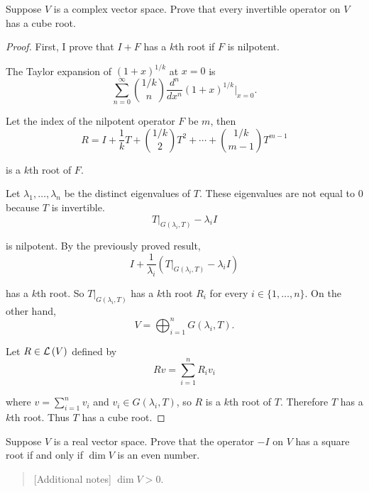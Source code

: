 \begin{exercise}\label{chapter8:sectionC:exercise3}
    Suppose $V$ is a complex vector space. Prove that every invertible operator on $V$ has a cube root.
\end{exercise}

\begin{proof}
    First, I prove that $I + F$ has a $k$th root if $F$ is nilpotent.

    The Taylor expansion of ${(1 + x)}^{1/k}$ at $x = 0$ is
    \[
        \sum^{\infty}_{n=0}\binom{1/k}{n}\frac{d^{n}}{dx^{n}}{(1 + x)}^{1/k}\vert_{x=0}.
    \]

    Let the index of the nilpotent operator $F$ be $m$, then
    \[
        R = I + \frac{1}{k}T + \binom{1/k}{2}T^{2} + \cdots + \binom{1/k}{m-1}T^{m-1}
    \]

    is a $k$th root of $F$.

    Let $\lambda_{1}, \ldots, \lambda_{n}$ be the distinct eigenvalues of $T$. These eigenvalues are not equal to $0$ because $T$ is invertible.
    \[
        T\vert_{G(\lambda_{i}, T)} - \lambda_{i}I
    \]

    is nilpotent. By the previously proved result,
    \[
        I + \frac{1}{\lambda_{i}}(T\vert_{G(\lambda_{i}, T)} - \lambda_{i}I)
    \]

    has a $k$th root. So $T\vert_{G(\lambda_{i}, T)}$ has a $k$th root $R_{i}$ for every $i\in\{1,\ldots,n\}$. On the other hand,
    \[
        V = \bigoplus^{n}_{i=1}G(\lambda_{i}, T).
    \]

    Let $R\in\mathcal{L}\left({V}\right)$ defined by
    \[
        Rv = \sum^{n}_{i=1}R_{i}v_{i}
    \]

    where $v = \sum^{n}_{i=1}v_{i}$ and $v_{i}\in G(\lambda_{i}, T)$, so $R$ is a $k$th root of $T$. Therefore $T$ has a $k$th root. Thus $T$ has a cube root.
\end{proof}
\newpage

\begin{exercise}\label{chapter8:sectionC:exercise4}
    Suppose $V$ is a real vector space. Prove that the operator $-I$ on $V$ has a square root if and only if $\dim V$ is an even number.
\end{exercise}

\begin{quote}[Additional notes]
    $\dim V > 0$.
\end{quote}


